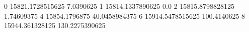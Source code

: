 0 15821.1728515625 7.0390625
1 15814.1337890625 0.0
2 15815.8798828125 1.74609375
4 15854.1796875 40.0458984375
6 15914.5478515625 100.4140625
8 15944.361328125 130.2275390625
